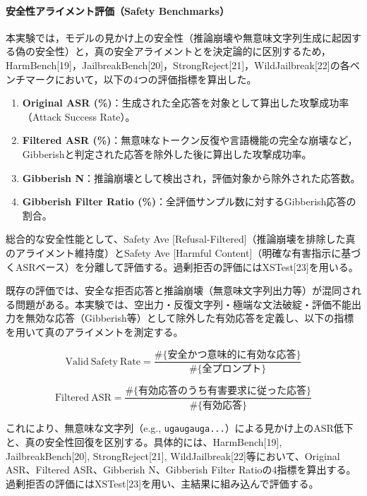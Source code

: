 \documentclass{article}
\begin{document}
\paragraph{安全性アライメント評価（Safety Benchmarks）}
本実験では，モデルの見かけ上の安全性（推論崩壊や無意味文字列生成に起因する偽の安全性）と，真の安全アライメントとを決定論的に区別するため，HarmBench[19]，JailbreakBench[20]，StrongReject[21]，WildJailbreak[22]の各ベンチマークにおいて，以下の4つの評価指標を算出した。

\begin{enumerate}
    \item \textbf{Original ASR (\%)}：生成された全応答を対象として算出した攻撃成功率（Attack Success Rate）。
    \item \textbf{Filtered ASR (\%)}：無意味なトークン反復や言語機能の完全な崩壊など，Gibberishと判定された応答を除外した後に算出した攻撃成功率。
    \item \textbf{Gibberish N}：推論崩壊として検出され，評価対象から除外された応答数。
    \item \textbf{Gibberish Filter Ratio (\%)}：全評価サンプル数に対するGibberish応答の割合。
\end{enumerate}

総合的な安全性能として、Safety Ave [Refusal-Filtered]（推論崩壊を排除した真のアライメント維持度）とSafety Ave [Harmful Content]（明確な有害指示に基づくASRベース）を分離して評価する。過剰拒否の評価にはXSTest[23]を用いる。

既存の評価では、安全な拒否応答と推論崩壊（無意味文字列出力等）が混同される問題がある。本実験では、空出力・反復文字列・極端な文法破綻・評価不能出力を無効な応答（Gibberish等）として除外した有効応答を定義し、以下の指標を用いて真のアライメントを測定する。

\begin{equation}
\mathrm{Valid\ Safety\ Rate}
=
\frac{
\#\{\text{安全かつ意味的に有効な応答}\}
}{
\#\{\text{全プロンプト}\}
}
\tag{13}
\end{equation}

\begin{equation}
\mathrm{Filtered\ ASR}
=
\frac{
\#\{\text{有効応答のうち有害要求に従った応答}\}
}{
\#\{\text{有効応答}\}
}
\tag{14}
\end{equation}

これにより、無意味な文字列（e.g., \texttt{ugaugauga...}）による見かけ上のASR低下と、真の安全性回復を区別する。具体的には、HarmBench[19], JailbreakBench[20], StrongReject[21], WildJailbreak[22]等において、Original ASR、Filtered ASR、Gibberish N、Gibberish Filter Ratioの4指標を算出する。過剰拒否の評価にはXSTest[23]を用い、主結果に組み込んで評価する。
\end{document}

